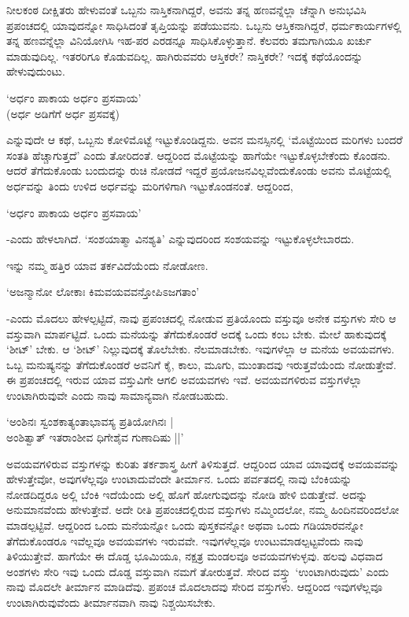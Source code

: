 ನೀಲಕಂಠ ದೀಕ್ಷಿತರು ಹೇಳುವಂತೆ ಒಬ್ಬನು ನಾಸ್ತಿಕನಾಗಿದ್ದರೆ, ಅವನು ತನ್ನ ಹಣವನ್ನೆಲ್ಲಾ ಚೆನ್ನಾಗಿ ಅನುಭವಿಸಿ ಪ್ರಪಂಚದಲ್ಲಿ ಯಾವುದನ್ನೋ ಸಾಧಿಸಿದಂತೆ ತೃಪ್ತಿಯನ್ನು ಪಡೆಯುವನು. ಒಬ್ಬನು ಆಸ್ತಿಕನಾಗಿದ್ದರೆ, ಧರ್ಮಕಾರ್ಯಗಳಲ್ಲಿ ತನ್ನ ಹಣವನ್ನೆಲ್ಲಾ ವಿನಿಯೋಗಿಸಿ ಇಹ-ಪರ ಎರಡನ್ನೂ ಸಾಧಿಸಿಕೊಳ್ಳುತ್ತಾನೆ. ಕೆಲವರು ತಮಗಾಗಿಯೂ ಖರ್ಚು ಮಾಡುವುದಿಲ್ಲ. ಇತರರಿಗೂ ಕೊಡುವದಿಲ್ಲ. ಹಾಗಿರುವವರು ಆಸ್ತಿಕರೇ? ನಾಸ್ತಿಕರೇ? ಇದಕ್ಕೆ ಕಥೆಯೊಂದನ್ನು ಹೇಳುವುದುಂಟು.

\begin{shloka}
`ಅರ್ಧಂ ಪಾಕಾಯ ಅರ್ಧಂ ಪ್ರಸವಾಯ'\\
(ಅರ್ಧ ಅಡಿಗೆಗೆ ಅರ್ಧ ಪ್ರಸವಕ್ಕೆ)
\end{shloka}

ಎನ್ನುವುದೇ ಆ ಕಥೆ, ಒಬ್ಬನು ಕೋಳಿಮೊಟ್ಟೆ ಇಟ್ಟುಕೊಂಡಿದ್ದನು. ಅವನ ಮನಸ್ಸಿನಲ್ಲಿ `ಮೊಟ್ಟೆಯಿಂದ ಮರಿಗಳು ಬಂದರೆ ಸಂತತಿ ಹೆಚ್ಚಾಗುತ್ತದೆ' ಎಂದು ತೋರಿದಂತೆ. ಆದ್ದರಿಂದ ಮೊಟ್ಟೆಯನ್ನು ಹಾಗೆಯೇ ಇಟ್ಟುಕೊಳ್ಳಬೇಕೆಂದು ಕೊಂಡನು. ಆದರೆ ತೆಗೆದುಕೊಂಡು ಬಂದುದನ್ನು ರುಚಿ ನೋಡದೆ ಇದ್ದರೆ ಪ್ರಯೋಜನವಿಲ್ಲವೆಂದುಕೊಂಡು ಅವನು ಮೊಟ್ಟೆಯಲ್ಲಿ ಅರ್ಧವನ್ನು ತಿಂದು ಉಳಿದ ಅರ್ಧವನ್ನು ಮರಿಗಳಿಗಾಗಿ ಇಟ್ಟುಕೊಂಡನಂತೆ. ಆದ್ದರಿಂದ,

\begin{shloka}
`ಅರ್ಧಂ ಪಾಕಾಯ ಅರ್ಧಂ ಪ್ರಸವಾಯ'
\end{shloka}

-ಎಂದು ಹೇಳಲಾಗಿದೆ. `ಸಂಶಯಾತ್ಮಾ ವಿನಶ್ಯತಿ' ಎನ್ನುವುದರಿಂದ ಸಂಶಯವನ್ನು ಇಟ್ಟುಕೊಳ್ಳಲೇಬಾರದು.

ಇನ್ನು ನಮ್ಮ ಹತ್ತಿರ ಯಾವ ತರ್ಕವಿದೆಯೆಂದು ನೋಡೋಣ.

\begin{shloka}
`ಅಜನ್ಮಾನೋ ಲೋಕಾಃ ಕಿಮವಯವವನ್ತೋಪಿಽಜಗತಾಂ'
\end{shloka}

-ಎಂದು ಮೊದಲು ಹೇಳಲ್ಪಟ್ಟಿದೆ, ನಾವು ಪ್ರಪಂಚದಲ್ಲಿ ನೋಡುವ ಪ್ರತಿಯೊಂದು ವಸ್ತುವೂ ಅನೇಕ ವಸ್ತುಗಳು ಸೇರಿ ಆ ವಸ್ತುವಾಗಿ ಮಾರ್ಪಟ್ಟಿದೆ. ಒಂದು ಮನೆಯನ್ನು ತೆಗೆದುಕೊಂಡರೆ ಅದಕ್ಕೆ ಒಂದು ಕಂಬ ಬೇಕು. ಮೇಲೆ ಹಾಕುವುದಕ್ಕೆ `ಶೀಟ್' ಬೇಕು. ಆ `ಶೀಟ್' ನಿಲ್ಲುವುದಕ್ಕೆ ತೊಲೆಬೇಕು. ನೆಲಮಾಡಬೇಕು. ಇವುಗಳೆಲ್ಲಾ ಆ ಮನೆಯ ಅವಯವಗಳು. ಒಬ್ಬ ಮನುಷ್ಯನನ್ನು ತೆಗೆದುಕೊಂಡರೆ ಅವನಿಗೆ ಕೈ, ಕಾಲು, ಮೂಗು, ಮುಂತಾದವು ಇರುತ್ತವೆಯೆಂದು ನೋಡುತ್ತೇವೆ. ಈ ಪ್ರಪಂಚದಲ್ಲಿ ಇರುವ ಯಾವ ವಸ್ತುವಿಗೇ ಆಗಲಿ ಅವಯವಗಳು ಇವೆ. ಅವಯವಗಳಿರುವ ವಸ್ತುಗಳೆಲ್ಲಾ ಉಂಟಾಗಿರುವುವೇ ಎಂದು ನಾವು ಸಾಮಾನ್ಯವಾಗಿ ನೋಡಬಹುದು.

\begin{shloka}
`ಅಂಶಿನಃ ಸ್ವಂಶಕಾತ್ಯಂತಾಭಾವಸ್ಯ ಪ್ರತಿಯೋಗಿನಃ |\\
ಅಂಶಿತ್ವಾತ್ ಇತರಾಂಶೀವ ಧಿಗೇಶೈವ ಗುಣಾದಿಷು ||'
\end{shloka}

ಅವಯವಗಳಿರುವ ವಸ್ತುಗಳನ್ನು ಕುರಿತು ತರ್ಕಶಾಸ್ತ್ರ ಹೀಗೆ ತಿಳಿಸುತ್ತದೆ. ಆದ್ದರಿಂದ ಯಾವ ಯಾವುದಕ್ಕೆ ಅವಯವವನ್ನು ಹೇಳುತ್ತೇವೋ, ಅವುಗಳೆಲ್ಲವೂ ಉಂಟಾದುವೆಂದೇ ತೀರ್ಮಾನ. ಒಂದು ಪರ್ವತದಲ್ಲಿ ನಾವು ಬೆಂಕಿಯನ್ನು ನೋಡದಿದ್ದರೂ ಅಲ್ಲಿ ಬೆಂಕಿ ಇದೆಯೆಂದು ಅಲ್ಲಿ ಹೊಗೆ ಹೋಗುವುದನ್ನು ನೋಡಿ ಹೇಳಿ ಬಿಡುತ್ತೇವೆ. ಅದನ್ನು ಅನುಮಾನವೆಂದು ಹೇಳುತ್ತೇವೆ. ಅದೇ ರೀತಿ ಪ್ರಪಂಚದಲ್ಲಿರುವ ವಸ್ತುಗಳು ನಮ್ಮಿಂದಲೋ, ನಮ್ಮ ಹಿಂದಿನವರಿಂದಲೋ ಮಾಡಲ್ಪಟ್ಟಿವೆ. ಆದ್ದರಿಂದ ಒಂದು ಮನೆಯನ್ನೋ ಒಂದು ಪುಸ್ತಕವನ್ನೋ ಅಥವಾ ಒಂದು ಗಡಿಯಾರವನ್ನೋ ತೆಗೆದುಕೊಂಡರೂ ಇವೆಲ್ಲವೂ ಅವಯವಗಳು ಇರುವವೇ. ಇವುಗಳೆಲ್ಲವೂ ಉಂಟುಮಾಡಲ್ಪಟ್ಟವೆಂದು ನಾವು ತಿಳಿಯುತ್ತೇವೆ. ಹಾಗೆಯೇ ಈ ದೊಡ್ಡ ಭೂಮಿಯೂ, ನಕ್ಷತ್ರ ಮಂಡಲವೂ ಅವಯವಗಳುಳ್ಳವು. ಹಲವು ವಿಧವಾದ ಅಂಶಗಳು ಸೇರಿ ಇವು ಒಂದು ದೊಡ್ಡ ವಸ್ತುವಾಗಿ ನಮಗೆ ತೋರುತ್ತವೆ. ಸೇರಿದ ವಸ್ತ್ತು `ಉಂಟಾಗಿರುವುದು' ಎಂದು ನಾವು ಮೊದಲೇ ತೀರ್ಮಾನ ಮಾಡಿದೆವು. ಪ್ರಪಂಚ ಮೊದಲಾದವು ಸೇರಿದ ವಸ್ತುಗಳು. ಆದ್ದರಿಂದ ಇವುಗಳೆಲ್ಲವೂ ಉಂಟಾಗಿರುವುವೆಂದು ತೀರ್ಮಾನವಾಗಿ ನಾವು ನಿಶ್ಚಯಿಸಬೇಕು.

